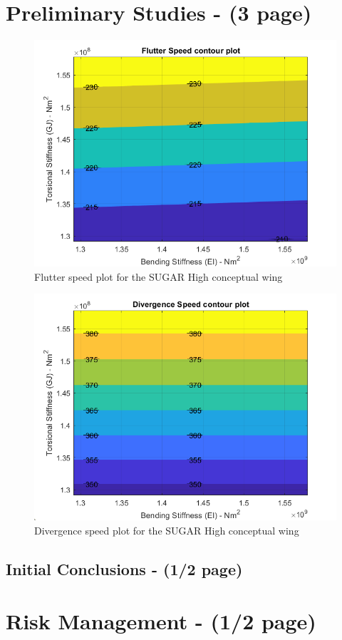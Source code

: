 \documentclass[11pt]{article}
\begin{document}
\section{Preliminary Studies - (3 page)}
\begin{figure}[H]
    \centering
    \includegraphics[width = .7\textwidth]{figures/SUGAR-High_flutter.png}
    \caption{Flutter speed plot for the SUGAR High conceptual wing}
    \label{fig:SUGAR-flutter}
\end{figure}

\begin{figure}[H]
    \centering
    \includegraphics[width = .7\textwidth]{figures/SUGAR-High_divergence.png}
    \caption{Divergence speed plot for the SUGAR High conceptual wing}
    \label{fig:SUGAR-divergence}
\end{figure}

\subsection{Initial Conclusions - (1/2 page)}

\section{Risk Management - (1/2 page)}
\end{document}
